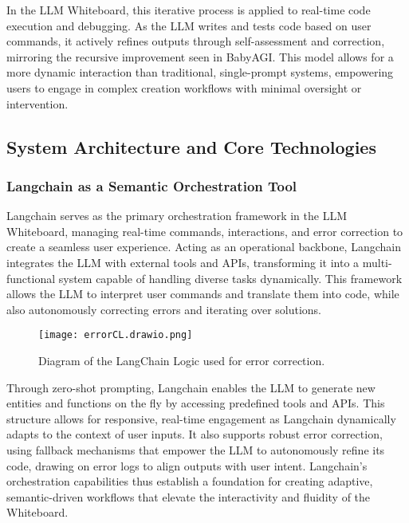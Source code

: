 In the LLM Whiteboard, this iterative process is applied to real-time code execution and debugging.
As the LLM writes and tests code based on user commands, it actively refines outputs through self-assessment and correction, mirroring the recursive improvement seen in BabyAGI.
This model allows for a more dynamic interaction than traditional, single-prompt systems, empowering users to engage in complex creation workflows with minimal oversight or intervention.

\subsection{System Architecture and Core Technologies}

\subsubsection{ Langchain as a Semantic Orchestration Tool }
Langchain\cite{chase2022} serves as the primary orchestration framework in the LLM Whiteboard, managing real-time commands, interactions, and error correction to create a seamless user experience.
Acting as an operational backbone, Langchain integrates the LLM with external tools and APIs, transforming it into a multi-functional system capable of handling diverse tasks dynamically.
This framework allows the LLM to interpret user commands and translate them into code, while also autonomously correcting errors and iterating over solutions.

\begin{figure}[h!]
    \centering
    \texttt{[image: errorCL.drawio.png]}
    \caption{Diagram of the LangChain Logic used for error correction.}
    \vspace{0.1cm}
    \label{fig:langchainlogic}
\end{figure}

Through zero-shot prompting, Langchain enables the LLM to generate new entities and functions on the fly by accessing predefined tools and APIs.
This structure allows for responsive, real-time engagement as Langchain dynamically adapts to the context of user inputs.
It also supports robust error correction, using fallback mechanisms that empower the LLM to autonomously refine its code, drawing on error logs to align outputs with user intent.
Langchain’s orchestration capabilities thus establish a foundation for creating adaptive, semantic-driven workflows that elevate the interactivity and fluidity of the Whiteboard.

